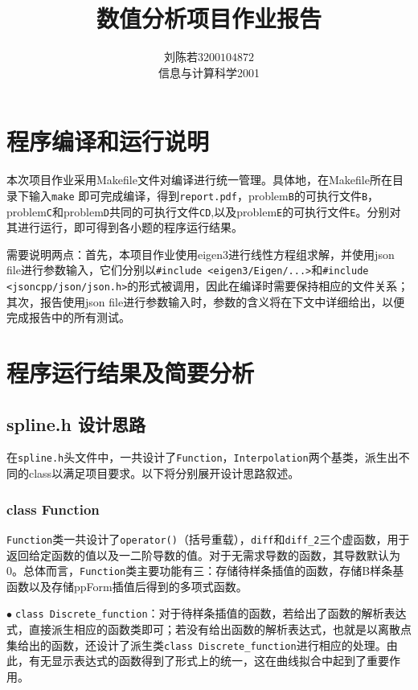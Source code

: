 \documentclass{ctexart}
\begin{document}
\begin{sloppypar}
\title{\vspace{-3cm} \textbf{数值分析项目作业报告}}
\author{刘陈若\;$3200104872$\\信息与计算科学2001}
\date{}

\maketitle

\section{程序编译和运行说明}
本次项目作业采用Makefile文件对编译进行统一管理。具体地，在Makefile所在目录下输入\verb|make|
即可完成编译，得到\verb|report.pdf|，problem\verb|B|的可执行文件\verb|B|，problem\verb|C|和problem\verb|D|共同的可执行文件\verb|CD|,以及problem\verb|E|的可执行文件\verb|E|。分别对其进行运行，即可得到各小题的程序运行结果。

需要说明两点：首先，本项目作业使用eigen3进行线性方程组求解，并使用json file进行参数输入，它们分别以\verb|#include <eigen3/Eigen/...>|和\verb|#include <jsoncpp/json/json.h>|的形式被调用，因此在编译时需要保持相应的文件关系；其次，报告使用json file进行参数输入时，参数的含义将在下文中详细给出，以便完成报告中的所有测试。

\section{程序运行结果及简要分析}
\subsection{spline.h 设计思路}
在\verb|spline.h|头文件中，一共设计了\verb|Function|，\verb|Interpolation|两个基类，派生出不同的class以满足项目要求。以下将分别展开设计思路叙述。
\subsubsection{class Function}
\verb|Function|类一共设计了\verb|operator()|（括号重载），\verb|diff|和\verb|diff_2|三个虚函数，用于返回给定函数的值以及一二阶导数的值。对于无需求导数的函数，其导数默认为0。总体而言，\verb|Function|类主要功能有三：存储待样条插值的函数，存储B样条基函数以及存储ppForm插值后得到的多项式函数。

$\bullet \;$\verb|class Discrete_function|：对于待样条插值的函数，若给出了函数的解析表达式，直接派生相应的函数类即可；若没有给出函数的解析表达式，也就是以离散点集给出的函数，还设计了派生类\verb|class Discrete_function|进行相应的处理。由此，有无显示表达式的函数得到了形式上的统一，这在曲线拟合中起到了重要作用。


\end{sloppypar}
\end{document}

